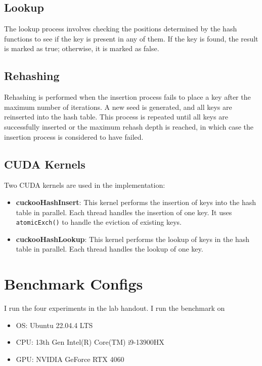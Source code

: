 \documentclass{article}
\begin{document}
\subsection{Lookup}
The lookup process involves checking the positions determined by the hash functions to see if the key is present in any of them. If the key is found, the result is marked as true; otherwise, it is marked as false.

\subsection{Rehashing}
Rehashing is performed when the insertion process fails to place a key after the maximum number of iterations. A new seed is generated, and all keys are reinserted into the hash table. This process is repeated until all keys are successfully inserted or the maximum rehash depth is reached, in which case the insertion process is considered to have failed.

\subsection{CUDA Kernels}
Two CUDA kernels are used in the implementation:
\begin{itemize}
    \item \textbf{cuckooHashInsert}: This kernel performs the insertion of keys into the hash table in parallel. Each thread handles the insertion of one key. It uses \verb|atomicExch()| to handle the eviction of existing keys.
    \item \textbf{cuckooHashLookup}: This kernel performs the lookup of keys in the hash table in parallel. Each thread handles the lookup of one key.
\end{itemize}

\section{Benchmark Configs}

I run the four experiments in the lab handout.
I run the benchmark on 
\begin{itemize}
    \item OS: Ubuntu 22.04.4 LTS
    \item CPU: 13th Gen Intel(R) Core(TM) i9-13900HX
    \item GPU: NVIDIA GeForce RTX 4060
\end{itemize}
\end{document}
